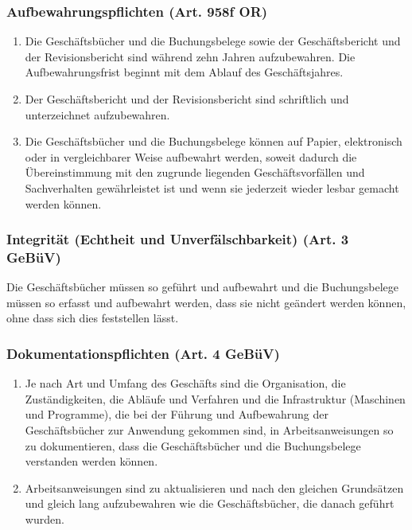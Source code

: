\subsubsection{Aufbewahrungspflichten (Art. 958f OR)}
\label{sec:DigiTrans-Aufbewahrungspflichten}

\begin{enumerate}
	\tightlist
	\item Die Geschäftsbücher und die Buchungsbelege sowie der Geschäftsbericht und der
	Revisionsbericht sind während zehn Jahren aufzubewahren. Die Aufbewahrungsfrist beginnt
	mit dem Ablauf des Geschäftsjahres.
	\item Der Geschäftsbericht und der Revisionsbericht sind schriftlich und unterzeichnet
	aufzubewahren.
	\item Die Geschäftsbücher und die Buchungsbelege können auf Papier, elektronisch oder in
	vergleichbarer Weise aufbewahrt werden, soweit dadurch die Übereinstimmung mit den
	zugrunde liegenden Geschäftsvorfällen und Sachverhalten gewährleistet ist und wenn sie
	jederzeit wieder lesbar gemacht werden können.
\end{enumerate}

\subsubsection{Integrität (Echtheit und Unverfälschbarkeit) (Art. 3 GeBüV)}
\label{sec:DigiTrans-Integrität}
Die Geschäftsbücher müssen so geführt und aufbewahrt und die Buchungsbelege
müssen so erfasst und aufbewahrt werden, dass sie nicht geändert werden können,
ohne dass sich dies feststellen lässt.

\subsubsection{Dokumentationspflichten (Art. 4 GeBüV)}
\label{sec:DigiTrans-Dokumentationspflicht}

\begin{enumerate}
	\tightlist
	\item Je nach Art und Umfang des Geschäfts sind die Organisation, die
	Zuständigkeiten, die Abläufe und Verfahren und die Infrastruktur (Maschinen
	und Programme), die bei der Führung und Aufbewahrung der
	Geschäftsbücher zur Anwendung gekommen sind, in Arbeitsanweisungen so
	zu dokumentieren, dass die Geschäftsbücher und die Buchungsbelege
	verstanden werden können.
	\item Arbeitsanweisungen sind zu aktualisieren und nach den gleichen
	Grundsätzen und gleich lang aufzubewahren wie die Geschäftsbücher,
	die danach geführt wurden.
\end{enumerate}
